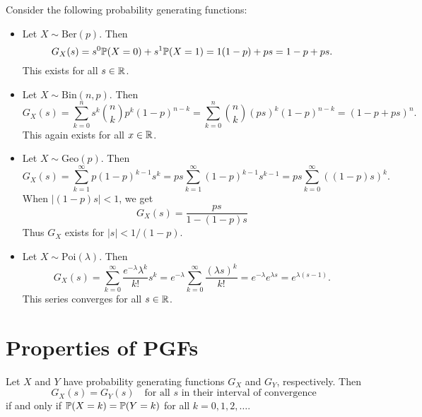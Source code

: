 \begin{example}
  Consider the following probability generating
  functions:
  \begin{itemize}
    \item Let $X \sim \mathrm{Ber}(p)$. Then
      \[
        G_X(s) = s^0 \mathbb{P}(X = 0)
        + s^1 \mathbb{P}(X = 1)
        = 1(1 - p) + ps = 1 - p + ps.
      \]
      This exists for all $s \in \mathbb{R}$.
    \item Let $X \sim \mathrm{Bin}(n, p)$. Then
      \[
        G_X(s) = \sum_{k = 0}^n s^k \binom{n}{k} p^k (1 - p)^{n - k}
        = \sum_{k = 0}^n \binom{n}{k} (ps)^k (1 - p)^{n - k}
        = (1 - p + ps)^n.
      \]
      This again exists for all $x \in \mathbb{R}$.
    \item Let $X \sim \mathrm{Geo}(p)$. Then
      \[
        G_X(s)
        = \sum_{k = 1}^\infty p(1 - p)^{k - 1} s^k
        = ps \sum_{k = 1}^\infty (1 - p)^{k - 1} s^{k - 1}
        = ps \sum_{k = 0}^\infty ((1 - p) s)^k.
      \]
      When $|(1 - p) s| < 1$, we get
      \[
        G_X(s)
        = \frac{ps}{1 - (1 - p)s}
      \]
      Thus $G_X$ exists
      for $|s| < 1 / (1 - p)$.
    \item Let $X \sim \mathrm{Poi}(\lambda)$.
      Then
      \[
        G_X(s)
        = \sum_{k = 0}^\infty \frac{e^{-\lambda} \lambda^k}{k!} s^k
        = e^{-\lambda} \sum_{k = 0}^\infty \frac{(\lambda s)^k}{k!}
        = e^{-\lambda} e^{\lambda s}
        = e^{\lambda(s - 1)}.
      \]
      This series converges for all $s \in \mathbb{R}$.
  \end{itemize}
\end{example}

\section{Properties of PGFs}
\begin{theorem}
  Let $X$ and $Y$ have probability generating
  functions
  $G_X$ and $G_Y$, respectively.
  Then
  \[G_X(s) = G_Y(s)
    \quad \text{for all $s$ in their interval of convergence} 
  \]
  if and only if $\mathbb{P}(X = k) = \mathbb{P}(Y = k)$ for
  all $k = 0, 1, 2, \dots$.
\end{theorem}

